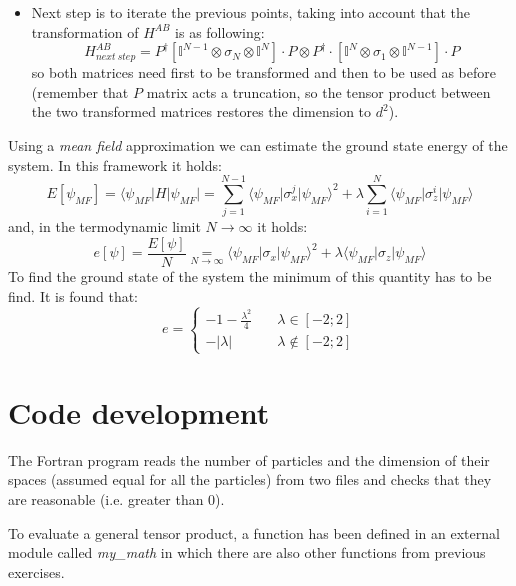 \documentclass[12pt, a4paper, notitlepage]{report}
\begin{document}
\begin{itemize}
	\item Next step is to iterate the previous points, taking into account that the transformation of $H^{AB}$ is as following:
	\begin{equation}
		H^{AB}_{next\ step} = P^{\dagger} \left[ \mathbb{I}^{N-1} \otimes \sigma_N \otimes \mathbb{I}^N \right] \cdot P \otimes P^{\dagger} \cdot \left[ \mathbb{I}^{N} \otimes \sigma_1 \otimes \mathbb{I}^{N-1} \right] \cdot P
	\end{equation}
	so both matrices need first to be transformed and then to be used as before (remember that $P$ matrix acts a truncation, so the tensor product between the two transformed matrices restores the dimension to $d^2$).
\end{itemize}

Using a \textit{mean field} approximation we can estimate the ground state energy of the system. In this framework it holds:
\begin{equation}
	E[\psi_{MF}] = \langle \psi_{MF} \rvert H \lvert \psi_{MF} \rvert = \sum_{j=1}^{N-1} \langle \psi_{MF} \rvert \sigma_x^j \lvert \psi_{MF} \rangle^2 + \lambda \sum_{i=1}^{N} \langle \psi_{MF} \rvert \sigma_z^i \lvert \psi_{MF} \rangle
\end{equation}
and, in the termodynamic limit $N \to \infty$ it holds:
\begin{equation}
	e[\psi] = \frac{E[\psi]}{N} \underset{N \to \infty}{=} \langle \psi_{MF} \rvert \sigma_x \lvert \psi_{MF} \rangle^2 + \lambda \langle \psi_{MF} \rvert \sigma_z \lvert \psi_{MF} \rangle
\end{equation}
To find the ground state of the system the minimum of this quantity has to be find. It is found that:
\begin{equation}
	e = \begin{cases}
	-1 - \frac{\lambda^2}{4} & \quad \lambda \in [-2;2] \\
	-\lvert \lambda \rvert & \quad \lambda \notin [-2;2]
	\end{cases}
\end{equation}


\section*{Code development}
The Fortran program reads the number of particles and the dimension of their spaces (assumed equal for all the particles) from two files and checks that they are reasonable (i.e. greater than 0).

To evaluate a general tensor product, a function has been defined in an external module called \textit{my\_math} in which there are also other functions from previous exercises.
\end{document}
